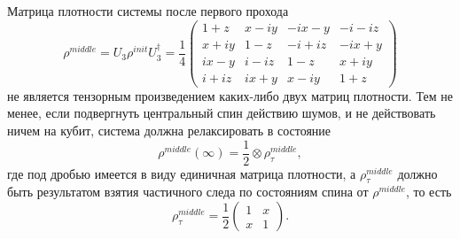 \documentclass[a4paper,12pt]{article}
\theoremstyle{plain} %
\theoremstyle{definition} %
\theoremstyle{remark} %
\begin{document}
Матрица плотности системы после первого прохода
\begin{equation}
    \rho^{middle} = U_3 \rho^{init} U_3^\dagger = \frac{1}{4}
    \begin{pmatrix}
        1 + z & x - iy & -ix - y & -i - iz \\
        x + iy & 1 - z & -i + iz & -ix + y \\
        ix - y & i - iz & 1 - z & x + iy \\
        i + iz & ix + y & x - iy & 1 + z
    \end{pmatrix}
\end{equation}
не является тензорным произведением каких-либо двух матриц плотности. Тем не менее, если подвергнуть центральный спин действию шумов, и не действовать ничем на кубит, система должна релаксировать в состояние
\begin{equation}
    \rho^{middle}(\infty) = \frac{1}{2} \otimes \rho^{middle}_\tau,
\end{equation}
где под дробью имеется в виду единичная матрица плотности, а $\rho^{middle}_\tau$ должно быть результатом взятия частичного следа по состояниям спина от $\rho^{middle}$, то есть
\begin{equation}
    \rho^{middle}_\tau = \frac{1}{2}
    \begin{pmatrix}
        1 & x \\
        x & 1
    \end{pmatrix}.
\end{equation}
\end{document}
